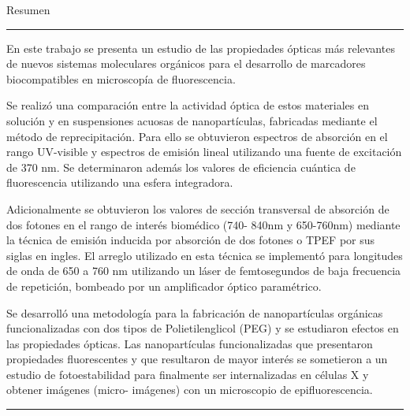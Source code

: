 \begin{vcenterpage}
{\LARGE{\sc Resumen}}

\noindent\rule[2pt]{\textwidth}{0.5pt}
En este trabajo se presenta un estudio de las propiedades \'opticas m\'as relevantes de nuevos sistemas moleculares org\'anicos para el desarrollo de marcadores biocompatibles en microscop\'ia de fluorescencia.

Se realiz\'o una comparaci\'on entre la actividad \'optica de estos materiales en soluci\'on y en suspensiones acuosas de nanopart\'iculas, fabricadas mediante el m\'etodo de reprecipitaci\'on. Para ello se obtuvieron espectros de absorci\'on en el rango UV-visible y espectros de emisi\'on lineal utilizando una fuente de excitaci\'on de 370 nm. Se determinaron adem\'as los valores de eficiencia cu\'antica de fluorescencia utilizando una esfera integradora. 

Adicionalmente se obtuvieron los valores de  secci\'on transversal de absorci\'on de dos fotones en el rango de inter\'es biom\'edico (740- 840nm y 650-760nm) mediante la t\'ecnica de emisi\'on inducida por absorci\'on de dos fotones o TPEF por sus siglas en ingles. El arreglo utilizado en esta t\'ecnica se implement\'o para longitudes de onda de 650 a 760 nm utilizando un l\'aser de femtosegundos de baja frecuencia de repetici\'on, bombeado por un amplificador \'optico param\'etrico.
	
Se desarroll\'o una metodolog\'ia para la fabricaci\'on de nanopart\'iculas org\'anicas funcionalizadas con dos tipos de Polietilenglicol (PEG) y se estudiaron efectos en las propiedades \'opticas. Las nanopart\'iculas funcionalizadas que presentaron propiedades fluorescentes y que resultaron de mayor inter\'es se sometieron a un estudio de fotoestabilidad para finalmente ser internalizadas en c\'elulas X y obtener im\'agenes (micro- im\'agenes) con un microscopio de epifluorescencia.


\noindent\rule[2pt]{\textwidth}{0.5pt}
\end{vcenterpage}
